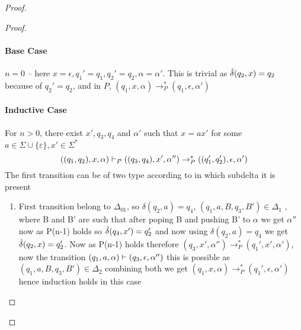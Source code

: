 \begin{soln}
\begin{proof}
\begin{proof}
\paragraph{Base Case}
$n=0$ -- here $x=\epsilon, q_1'=q_1, q_2'=q_2, \alpha = \alpha'$. This is trivial as $\hat{\delta}(q_2,x)=q_2$ because of $q_2'=q_2$, and in $P$, $(q_{1},x,\alpha) \to_{P}^* (q_{1},\epsilon,\alpha')$
\paragraph{Inductive Case}
For $n>0$, there exist $x',q_3,q_4$ and $\alpha'$ such that $x=ax'$ for some $a \in \Sigma \cup \{\varepsilon\}, x' \in \Sigma^*$
\[
((q_1, q_2), x, \alpha) \vdash_P ((q_3, q_4), x', \alpha'') \to_{P}^* ((q_1',q_2'),\epsilon,\alpha')
\]
The first transition can be of two type according to in which subdelta it is present

\begin{enumerate}
    \item First transition belong to $\Delta_{01}$, so $\delta(q_2,a)=q_4$, $(q_1,a,B,q_3,B') \in \Delta_1$ , where B and B' are such that after poping B and pushing B' to $\alpha$ we get $\alpha''$
    \newline now as P(n-1) holds so $\hat{\delta}(q_{4},x')=q_2'$ and now using $\delta(q_2,a)=q_4$ we get $\hat{\delta}(q_{2},x)=q_2'$. 
    Now as P(n-1) holds therefore $(q_{3},x',\alpha'') \to_{P}^* (q_1',x',\alpha')$, now the transition $( q_1,a,\alpha) \vdash (q_3,\epsilon,\alpha'')$  this is possible as $(q_1,a,B,q_3,B') \in \Delta_2$ combining both we get $( q_{1},x,\alpha) \to_{P}^* (q_1',\epsilon,\alpha')$ hence induction holds in this case
    
     

\end{enumerate}
\end{proof}
\end{proof}
\end{soln}
